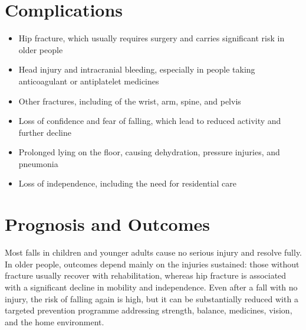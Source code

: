 \section*{Complications}
\begin{itemize}
    \item Hip fracture, which usually requires surgery and carries significant risk in older people
    \item Head injury and intracranial bleeding, especially in people taking anticoagulant or antiplatelet medicines
    \item Other fractures, including of the wrist, arm, spine, and pelvis
    \item Loss of confidence and fear of falling, which lead to reduced activity and further decline
    \item Prolonged lying on the floor, causing dehydration, pressure injuries, and pneumonia
    \item Loss of independence, including the need for residential care
\end{itemize}

\section*{Prognosis and Outcomes}
Most falls in children and younger adults cause no serious injury and resolve fully. In older people, outcomes depend mainly on the injuries sustained: those without fracture usually recover with rehabilitation, whereas hip fracture is associated with a significant decline in mobility and independence. Even after a fall with no injury, the risk of falling again is high, but it can be substantially reduced with a targeted prevention programme addressing strength, balance, medicines, vision, and the home environment.

